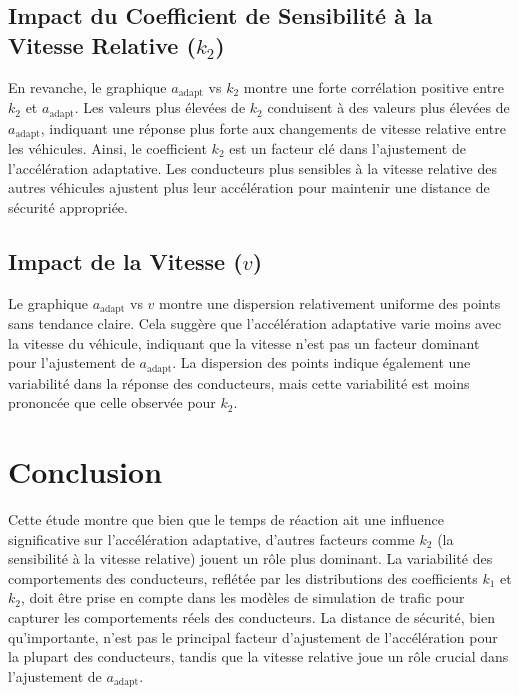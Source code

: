 \documentclass{article}
\begin{document}
\subsection{Impact du Coefficient de Sensibilité à la Vitesse Relative (\(k_2\))}

En revanche, le graphique \(a_{\text{adapt}} \) vs \( k_2 \) montre une forte corrélation positive entre \(k_2\) et \(a_{\text{adapt}}\). Les valeurs plus élevées de \(k_2\) conduisent à des valeurs plus élevées de \(a_{\text{adapt}}\), indiquant une réponse plus forte aux changements de vitesse relative entre les véhicules. Ainsi, le coefficient \(k_2\) est un facteur clé dans l'ajustement de l'accélération adaptative. Les conducteurs plus sensibles à la vitesse relative des autres véhicules ajustent plus leur accélération pour maintenir une distance de sécurité appropriée.

\subsection{Impact de la Vitesse (\(v\))}

Le graphique \(a_{\text{adapt}} \) vs \( v \) montre une dispersion relativement uniforme des points sans tendance claire. Cela suggère que l'accélération adaptative varie moins avec la vitesse du véhicule, indiquant que la vitesse n'est pas un facteur dominant pour l'ajustement de \(a_{\text{adapt}}\). La dispersion des points indique également une variabilité dans la réponse des conducteurs, mais cette variabilité est moins prononcée que celle observée pour \(k_2\).

\section{Conclusion}

Cette étude montre que bien que le temps de réaction ait une influence significative sur l'accélération adaptative, d'autres facteurs comme \(k_2\) (la sensibilité à la vitesse relative) jouent un rôle plus dominant. La variabilité des comportements des conducteurs, reflétée par les distributions des coefficients \(k_1\) et \(k_2\), doit être prise en compte dans les modèles de simulation de trafic pour capturer les comportements réels des conducteurs. La distance de sécurité, bien qu'importante, n'est pas le principal facteur d'ajustement de l'accélération pour la plupart des conducteurs, tandis que la vitesse relative joue un rôle crucial dans l'ajustement de \(a_{\text{adapt}}\).
\end{document}

